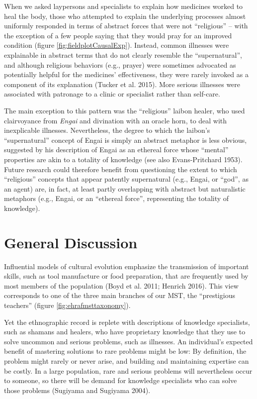 \documentclass[
  11pt,
]{article}
\begin{document}
When we asked laypersons and specialists to explain how medicines worked to heal the body, those who attempted to explain the underlying processes almost uniformly responded in terms of abstract forces that were not ``religious'' -- with the exception of a few people saying that they would pray for an improved condition (figure \ref{fig:fieldplotCausalExp}). Instead, common illnesses were explainable in abstract terms that do not clearly resemble the ``supernatural'', and although religious behaviors (e.g., prayer) were sometimes advocated as potentially helpful for the medicines' effectiveness, they were rarely invoked as a component of its explanation (Tucker et al. 2015). More serious illnesses were associated with patronage to a clinic or specialist rather than self-care.

The main exception to this pattern was the ``religious'' laibon healer, who used clairvoyance from \emph{Engai} and divination with an oracle horn, to deal with inexplicable illnesses. Nevertheless, the degree to which the laibon's ``supernatural'' concept of Engai is simply an abstract metaphor is less obvious, suggested by his description of Engai as an ethereal force whose ``mental'' properties are akin to a totality of knowledge (see also Evans-Pritchard 1953). Future research could therefore benefit from questioning the extent to which ``religious'' concepts that appear patently supernatural (e.g., Engai, or ``god'', as an agent) are, in fact, at least partly overlapping with abstract but naturalistic metaphors (e.g., Engai, or an ``ethereal force'', representing the totality of knowledge).

\hypertarget{general-discussion}{%
\section{General Discussion}\label{general-discussion}}

Influential models of cultural evolution emphasize the transmission of important skills, such as tool manufacture or food preparation, that are frequently used by most members of the population (Boyd et al. 2011; Henrich 2016). This view corresponds to one of the three main branches of our MST, the ``prestigious teachers'' (figure \ref{fig:ehrafmsttaxonomy}).

Yet the ethnographic record is replete with descriptions of knowledge specialists, such as shamans and healers, who have proprietary knowledge that they use to solve uncommon and serious problems, such as illnesses. An individual's expected benefit of mastering solutions to rare problems might be low: By definition, the problem might rarely or never arise, and building and maintaining expertise can be costly. In a large population, rare and serious problems will nevertheless occur to someone, so there will be demand for knowledge specialists who can solve those problems (Sugiyama and Sugiyama 2004).
\end{document}
